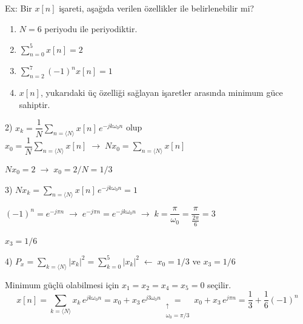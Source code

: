 \documentclass[11pt,a4paper]{article}
\begin{document}
\begin{ornek}
Ex: Bir $x[n]$ işareti, aşağıda verilen özellikler ile belirlenebilir mi?
\begin{enumerate}[label=\arabic*)]
\item $N=6$ periyodu ile periyodiktir. 
\item $\displaystyle\sum_{n=0}^{5} x[n]=2$
\item $\displaystyle\sum_{n=2}^{7} (-1)^n x[n]=1$
\item $x[n]$, yukarıdaki üç özelliği sağlayan işaretler arasında minimum güce sahiptir.
\end{enumerate}
\end{ornek}

2) $x_k=\dfrac{1}{N}\displaystyle\sum_{n=\langle N\rangle} x[n]\,e^{-jk\omega_0 n}$ olup $x_0=\dfrac{1}{N}\displaystyle\sum_{n=\langle N\rangle} x[n] \;\longrightarrow\; Nx_0=\sum_{n=\langle N\rangle} x[n]$

\quad $Nx_0=2 \;\longrightarrow\; x_0=2/N=1/3$

3) $Nx_k=\displaystyle\sum_{n=\langle N\rangle} x[n]\,e^{-jk\omega_0 n}=1$

\quad $(-1)^n=e^{-j\pi n} \;\longrightarrow\; e^{-j\pi n}=e^{-jk\omega_0 n} \;\longrightarrow\; k=\dfrac{\pi}{\omega_0}=\dfrac{\pi}{\frac{2\pi}{6}}=3$

\quad $x_3=1/6$

4) $P_x=\displaystyle\sum_{k=\langle N\rangle} |x_k|^2=\sum_{k=0}^{5} |x_k|^2 \;\longleftarrow\; x_0=1/3$ ve $x_3=1/6$

\hfill Minimum güçlü olabilmesi için $x_1=x_2=x_4=x_5=0$ seçilir.
\[ x[n]=\sum_{k=\langle N\rangle} x_k\,e^{jk\omega_0 n}=x_0+x_3\,e^{j3\omega_0 n}\underset{\substack{\uparrow\\ \omega_0=\pi/3}}{=}x_0+x_3\,e^{j\pi n}=\frac{1}{3}+\frac{1}{6}(-1)^n \]
\begin{center}
\end{center}
\end{document}
